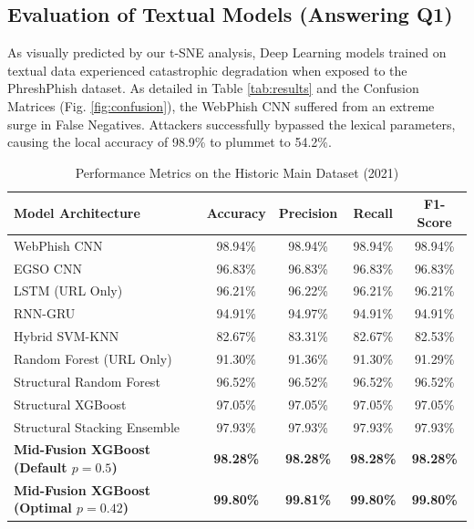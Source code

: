 \documentclass[conference]{IEEEtran}
\begin{document}
\subsection{Evaluation of Textual Models (Answering Q1)}
As visually predicted by our t-SNE analysis, Deep Learning models trained on textual data experienced catastrophic degradation when exposed to the PhreshPhish dataset. As detailed in Table \ref{tab:results} and the Confusion Matrices (Fig. \ref{fig:confusion}), the WebPhish CNN suffered from an extreme surge in False Negatives. Attackers successfully bypassed the lexical parameters, causing the local accuracy of 98.9\% to plummet to 54.2\%. 

\begin{table}[t]
\caption{Performance Metrics on the Historic Main Dataset (2021)}
\label{tab:results_2021}
\begin{center}
\begin{tabular}{lcccc}
\toprule
\textbf{Model Architecture} & \textbf{Accuracy} & \textbf{Precision} & \textbf{Recall} & \textbf{F1-Score} \\
\midrule
WebPhish CNN & 98.94\% & 98.94\% & 98.94\% & 98.94\% \\
EGSO CNN & 96.83\% & 96.83\% & 96.83\% & 96.83\% \\
LSTM (URL Only) & 96.21\% & 96.22\% & 96.21\% & 96.21\% \\
RNN-GRU & 94.91\% & 94.97\% & 94.91\% & 94.91\% \\
Hybrid SVM-KNN & 82.67\% & 83.31\% & 82.67\% & 82.53\% \\
Random Forest (URL Only) & 91.30\% & 91.36\% & 91.30\% & 91.29\% \\
Structural Random Forest & 96.52\% & 96.52\% & 96.52\% & 96.52\% \\
Structural XGBoost & 97.05\% & 97.05\% & 97.05\% & 97.05\% \\
Structural Stacking Ensemble & 97.93\% & 97.93\% & 97.93\% & 97.93\% \\
\midrule
\textbf{Mid-Fusion XGBoost (Default $p=0.5$)} & \textbf{98.28\%} & \textbf{98.28\%} & \textbf{98.28\%} & \textbf{98.28\%} \\
\textbf{Mid-Fusion XGBoost (Optimal $p=0.42$)} & \textbf{99.80\%} & \textbf{99.81\%} & \textbf{99.80\%} & \textbf{99.80\%} \\
\bottomrule
\end{tabular}
\end{center}
\end{table}
\end{document}
